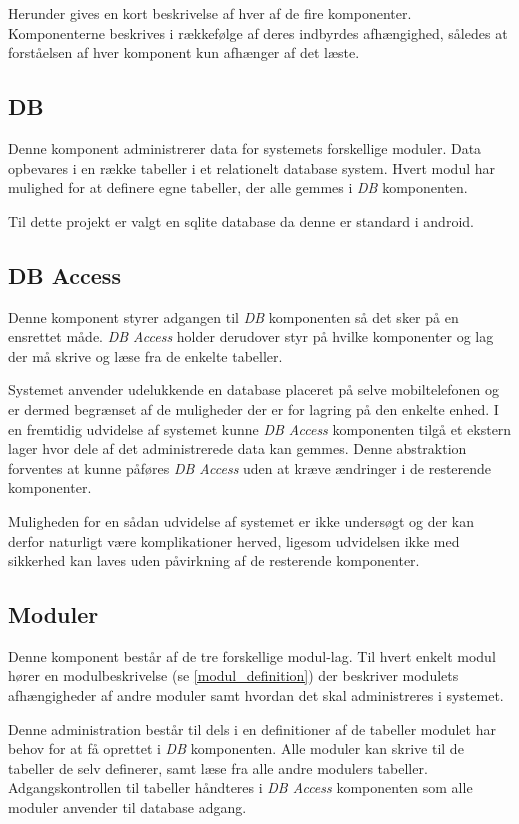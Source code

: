 Herunder gives en kort beskrivelse af hver af de fire komponenter.
Komponenterne beskrives i rækkefølge af deres indbyrdes afhængighed, således at forståelsen af hver komponent kun afhænger af det læste.

\subsection*{DB}
Denne komponent administrerer data for systemets forskellige moduler.
Data opbevares i en række tabeller i et relationelt database system.
Hvert modul har mulighed for at definere egne tabeller, der alle gemmes i \textit{DB} komponenten.

Til dette projekt er valgt en sqlite database da denne er standard i android.

\subsection*{DB Access}
Denne komponent styrer adgangen til \textit{DB} komponenten så det sker på en ensrettet måde.
\textit{DB Access} holder derudover styr på hvilke komponenter og lag der må skrive og læse fra de enkelte tabeller.

Systemet anvender udelukkende en database placeret på selve mobiltelefonen og er dermed begrænset af de muligheder der er for lagring på den enkelte enhed.
I en fremtidig udvidelse af systemet kunne \textit{DB Access} komponenten tilgå et ekstern lager hvor dele af det administrerede data kan gemmes.
Denne abstraktion forventes at kunne påføres \textit{DB Access} uden at kræve ændringer i de resterende komponenter.

Muligheden for en sådan udvidelse af systemet er ikke undersøgt og der kan derfor naturligt være komplikationer herved, ligesom udvidelsen ikke med sikkerhed kan laves uden påvirkning af de resterende komponenter.

\subsection*{Moduler}
Denne komponent består af de tre forskellige modul-lag.
Til hvert enkelt modul hører en modulbeskrivelse (se \cref{modul_definition}) der beskriver modulets afhængigheder af andre moduler samt hvordan det skal administreres i systemet.

Denne administration består til dels i en definitioner af de tabeller modulet har behov for at få oprettet i \textit{DB} komponenten.
Alle moduler kan skrive til de tabeller de selv definerer, samt læse fra alle andre modulers tabeller.
Adgangskontrollen til tabeller håndteres i \textit{DB Access} komponenten som alle moduler anvender til database adgang.

